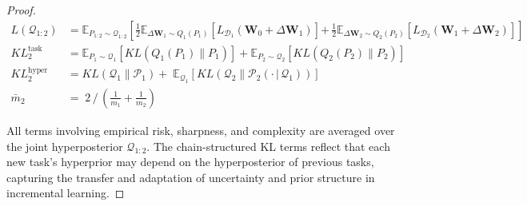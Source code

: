 \documentclass[letterpaper]{article} %
\begin{document}
\begin{proof}


\begin{align*}
L(\mathcal{Q}_{1:2}) &=\mathbb{E}_{P_{1:2} \sim \mathcal{Q}_{1:2}} 
\left[
    \frac{1}{2} \mathbb{E}_{\Delta\mathbf{W}_1 \sim Q_1(P_1)} 
    \left[
        L_{\mathcal{D}_1}(\mathbf{W}_0 + \Delta\mathbf{W}_1)
    \right] \right. \left.
    +\, \frac{1}{2} \mathbb{E}_{\Delta\mathbf{W}_2 \sim Q_2(P_2)} 
    \left[
        L_{\mathcal{D}_2}(\mathbf{W}_1 + \Delta\mathbf{W}_2)
    \right]
\right] \\
KL^{\text{task}}_2 &=
    \mathbb{E}_{P_1 \sim \mathcal{Q}_1}\left[ KL(Q_1(P_1)\|P_1) \right] + \mathbb{E}_{P_2 \sim \mathcal{Q}_2}\left[ KL(Q_2(P_2)\|P_2) \right] \\[1.2ex]
KL^{\text{hyper}}_2 &=
    KL(\mathcal{Q}_1\|\mathcal{P}_1)  +\; \mathbb{E}_{\mathcal{Q}_1}\left[ KL(\mathcal{Q}_2 \| \mathcal{P}_2(\cdot\,|\,\mathcal{Q}_1)) \right] \\
\bar{m}_2 &=\;  2\, /\, \left(\frac{1}{m_1} + \frac{1}{m_2}\right)
\end{align*}


 All terms involving empirical risk, sharpness, and complexity are averaged over the joint hyperposterior $\mathcal{Q}_{1:2}$. The chain-structured KL terms reflect that each new task's hyperprior may depend on the hyperposterior of previous tasks, capturing the transfer and adaptation of uncertainty and prior structure in incremental learning.



\end{proof}
\end{document}
